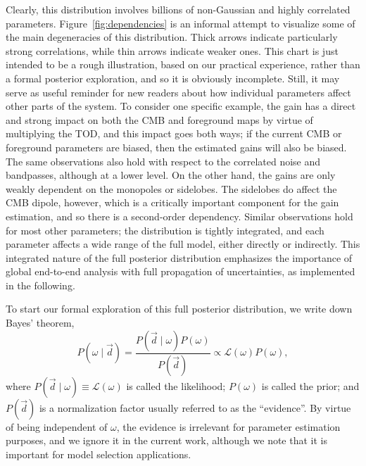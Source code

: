 \documentclass[twocolumn]{aa}
\renewcommand{\d}[0]{\vec{d}}
\begin{document}
Clearly, this distribution involves billions of non-Gaussian and
highly correlated parameters. Figure~\ref{fig:dependencies} is an
informal attempt to visualize some of the main degeneracies of this
distribution. Thick arrows indicate particularly strong correlations,
while thin arrows indicate weaker ones. This chart is just intended to be a
rough illustration, based on our practical experience, rather than a
formal posterior exploration, and so it is obviously
incomplete. Still, it may serve as useful reminder for new readers
about how individual parameters affect other parts of the system. To
consider one specific example, the gain has a direct and strong impact
on both the CMB and foreground maps by virtue of multiplying the TOD,
and this impact goes both ways; if the current CMB or foreground
parameters are biased, then the estimated gains will also be
biased. The same observations also hold with respect to the correlated
noise and bandpasses, although at a lower level. On the other hand,
the gains are only weakly dependent on the monopoles or sidelobes. The
sidelobes do affect the CMB dipole, however, which is a critically
important component for the gain estimation, and so there is a
second-order dependency. Similar observations hold for most
other parameters; the distribution is tightly integrated, and
each parameter affects a wide range of the full model, either directly
or indirectly. This integrated nature of the full posterior
distribution emphasizes the importance of global end-to-end analysis
with full propagation of uncertainties, as implemented in the
following.

To start our formal exploration of this full posterior distribution,
we write down Bayes' theorem,
\begin{equation}
  P(\omega\mid \d) = \frac{P(\d\mid \omega)P(\omega)}{P(\d)} \propto
  \mathcal{L}(\omega)P(\omega),
  \label{eq:jointpost}
\end{equation}
where $P(\d\mid \omega)\equiv\mathcal{L}(\omega)$ is called the
likelihood; $P(\omega)$ is called the prior; and $P(\d)$ is a
normalization factor usually referred to as the ``evidence''. By
virtue of being independent of $\omega$, the evidence is irrelevant
for parameter estimation purposes, and we ignore it in the current work,
although we note that it is important for model selection
applications.
\end{document}

